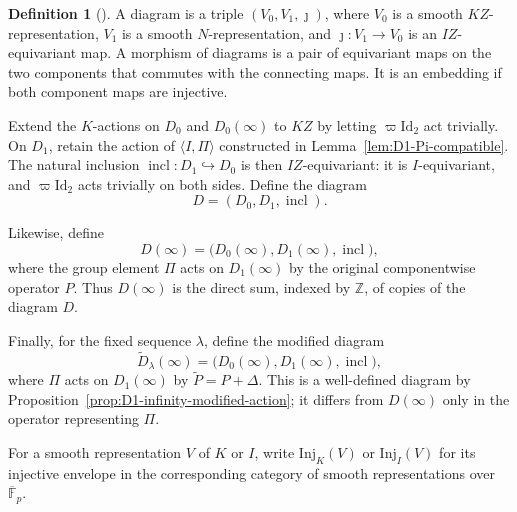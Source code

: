 \documentclass[10pt]{article}
\theoremstyle{plain}
\theoremstyle{definition}
\newtheorem{definition}[theorem]{Definition}
\theoremstyle{remark}
\newcommand{\Fpbar}{\overline{\mathbb{F}}_p}
\newcommand{\Inj}{\mathrm{Inj}}
\newcommand{\Id}{\mathrm{Id}}
\begin{document}
\begin{definition}[{\cite[Definition~9.7]{BP12}}]\label{def:diagrams}
A diagram is a triple $(V_0,V_1,\jmath)$, where $V_0$ is a smooth $KZ$-representation, $V_1$ is a smooth $N$-representation, and $\jmath:V_1\to V_0$ is an $IZ$-equivariant map. A morphism of diagrams is a pair of equivariant maps on the two components that commutes with the connecting maps. It is an embedding if both component maps are injective.
\end{definition}

Extend the $K$-actions on $D_0$ and $D_0(\infty)$ to $KZ$ by letting $\varpi\Id_2$ act trivially. On $D_1$, retain the action of $\langle I,\Pi\rangle$ constructed in Lemma~\ref{lem:D1-Pi-compatible}. The natural inclusion $\operatorname{incl}:D_1\hookrightarrow D_0$ is then $IZ$-equivariant: it is $I$-equivariant, and $\varpi\Id_2$ acts trivially on both sides. Define the diagram
\begin{equation}\label{eq:diagram-D}
D=(D_0,D_1,\operatorname{incl}).
\end{equation}

Likewise, define
\begin{equation}\label{eq:diagram-D-infinity}
D(\infty)=\bigl(D_0(\infty),D_1(\infty),\operatorname{incl}\bigr),
\end{equation}
where the group element $\Pi$ acts on $D_1(\infty)$ by the original componentwise operator $P$. Thus $D(\infty)$ is the direct sum, indexed by $\mathbb{Z}$, of copies of the diagram $D$.

Finally, for the fixed sequence $\lambda$, define the modified diagram
\begin{equation}\label{eq:diagram-modified-D-infinity}
\widetilde D_{\lambda}(\infty)=\bigl(D_0(\infty),D_1(\infty),\operatorname{incl}\bigr),
\end{equation}
where $\Pi$ acts on $D_1(\infty)$ by $\widetilde P=P+\Delta$. This is a well-defined diagram by Proposition~\ref{prop:D1-infinity-modified-action}; it differs from $D(\infty)$ only in the operator representing $\Pi$.

For a smooth representation $V$ of $K$ or $I$, write $\Inj_K(V)$ or $\Inj_I(V)$ for its injective envelope in the corresponding category of smooth representations over $\Fpbar$.
\end{document}
